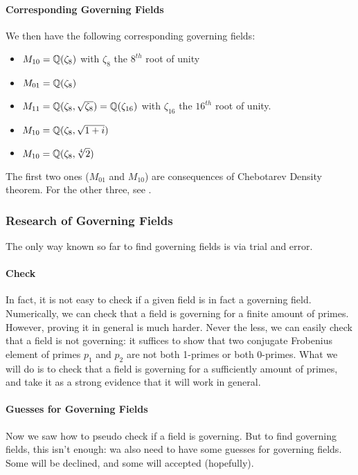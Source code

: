 \paragraph{Corresponding Governing Fields}
We then have the following corresponding governing fields:
\begin{itemize}
	\item $M_{10} = \mathbb{Q}(\zeta_8)$ with $\zeta_8$ the $8^{th}$ root of unity
	\item $M_{01} = \mathbb{Q}(\zeta_8)$
	\item $M_{11} = \mathbb{Q}(\zeta_8, \sqrt{\zeta_8}) = \mathbb{Q}(\zeta_{16})$ with $\zeta_{16}$ the $16^{th}$ root of unity.
	\item $M_{10} = \mathbb{Q}(\zeta_8, \sqrt{1+i})$
	\item $M_{10} = \mathbb{Q}(\zeta_8, \sqrt[4]{2})$
\end{itemize}
The first two ones ($M_{01}$ and $M_{10}$) are consequences of Chebotarev Density theorem.
For the other three, see \cite[§7]{StructureAlgebreHecke}.



\subsubsection{Research of Governing Fields}
The only way known so far to find governing fields is via trial and error.
\paragraph{Check}
In fact, it is not easy to check if a given field is in fact a governing field.
Numerically, we can check that a field is governing for a finite amount of primes.
However, proving it in general is much harder.
Never the less, we can easily check that a field is not governing: it suffices to show that two conjugate Frobenius element of primes $p_1$ and $p_2$ are not both 1-primes or both 0-primes.
What we will do is to check that a field is governing for a sufficiently amount of primes, and take it as a strong evidence that it will work in general. 

\paragraph{Guesses for Governing Fields}
Now we saw how to pseudo check if a field is governing.
But to find governing fields, this isn't enough: wa also need to have some guesses for governing fields.
Some will be declined, and some will accepted (hopefully).

